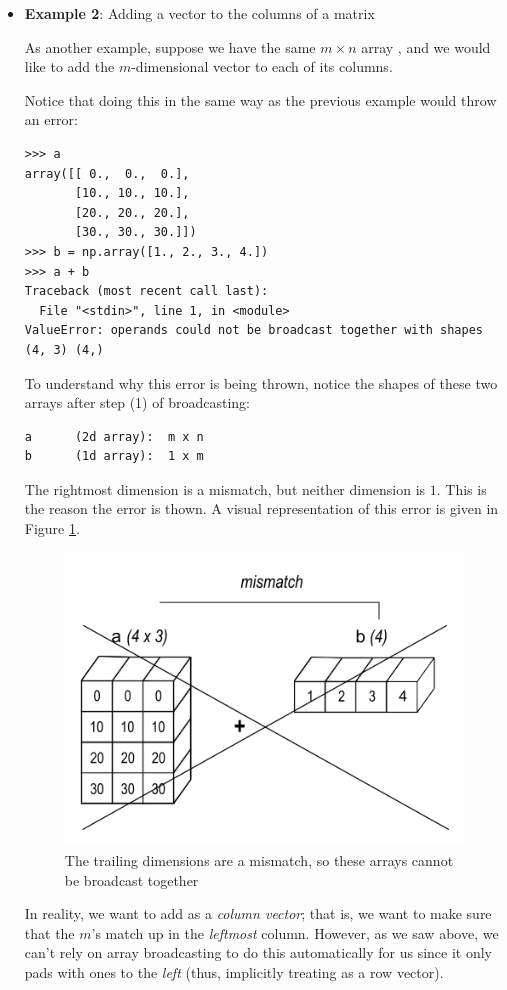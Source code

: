 \begin{itemize}
\item  \textbf{Example 2}: Adding a vector to the columns of a matrix

As another example, suppose we have the same $m \times n$ array , and we would like to add the $m$-dimensional vector  to each of its columns.

Notice that doing this in the same way as the previous example would throw an error:
\begin{lstlisting}
>>> a
array([[ 0.,  0.,  0.],
       [10., 10., 10.],
       [20., 20., 20.],
       [30., 30., 30.]])
>>> b = np.array([1., 2., 3., 4.])
>>> a + b
Traceback (most recent call last):
  File "<stdin>", line 1, in <module>
ValueError: operands could not be broadcast together with shapes (4, 3) (4,)
\end{lstlisting}

To understand why this error is being thrown, notice the shapes of these two arrays after step (1) of broadcasting:
\begin{lstlisting}
a	   (2d array):  m x n
b	   (1d array):  1 x m
\end{lstlisting}
The rightmost dimension is a mismatch, but neither dimension is $1$. This is the reason the error is thown. A visual representation of this error is given in Figure \ref{fig:broadcasting3}.

\begin{figure}[H]
    \includegraphics[width=.7\textwidth]{figures/broadcasting_mismatch.png}
    \caption{The trailing dimensions are a mismatch, so these arrays cannot be broadcast together}
    \label{fig:broadcasting3}
\end{figure}

In reality, we want to add  as a \emph{column vector}; that is, we want to make sure that the $m$'s match up in the \emph{leftmost} column.
However, as we saw above, we can't rely on array broadcasting to do this automatically for us since it only pads with ones to the \emph{left} (thus, implicitly treating  as a row vector).


\end{itemize}
